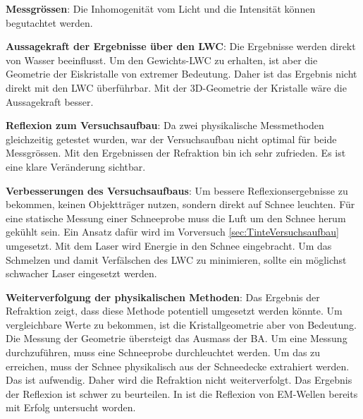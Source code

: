 \textbf{Messgrössen}:
Die Inhomogenität vom Licht und die Intensität können begutachtet werden. 



\textbf{Aussagekraft der Ergebnisse über den LWC}:
Die Ergebnisse werden direkt von Wasser beeinflusst. Um den Gewichts-LWC zu erhalten, ist aber die Geometrie der Eiskristalle von extremer Bedeutung. Daher ist das Ergebnis nicht direkt mit den LWC überführbar. Mit der 3D-Geometrie der Kristalle wäre die Aussagekraft besser.

\textbf{Reflexion zum Versuchsaufbau}:
Da zwei physikalische Messmethoden gleichzeitig getestet wurden, war der Versuchsaufbau nicht optimal für beide Messgrössen. Mit den Ergebnissen der Refraktion bin ich sehr zufrieden. Es ist eine klare Veränderung sichtbar.

\textbf{Verbesserungen des Versuchsaufbaus}:
Um bessere Reflexionsergebnisse zu bekommen, keinen Objektträger nutzen, sondern direkt auf Schnee leuchten. Für eine statische Messung einer Schneeprobe muss die Luft um den Schnee herum gekühlt sein. Ein Ansatz dafür wird im Vorversuch \ref{sec:TinteVersuchsaufbau} umgesetzt. Mit dem Laser wird Energie in den Schnee eingebracht. Um das Schmelzen und damit Verfälschen des LWC zu minimieren, sollte ein möglichst schwacher Laser eingesetzt werden.

\textbf{Weiterverfolgung der physikalischen Methoden}:
Das Ergebnis der Refraktion zeigt, dass diese Methode potentiell umgesetzt werden könnte. Um vergleichbare Werte zu bekommen, ist die Kristallgeometrie aber von Bedeutung. Die Messung der Geometrie übersteigt das Ausmass der BA. Um eine Messung durchzuführen, muss eine Schneeprobe durchleuchtet werden. Um das zu erreichen, muss der Schnee physikalisch aus der Schneedecke extrahiert werden. Das ist aufwendig. Daher wird die Refraktion nicht weiterverfolgt. Das Ergebnis der Reflexion ist schwer zu beurteilen. In \cite{Donahue.2022} ist die Reflexion von EM-Wellen bereits mit Erfolg untersucht worden.
